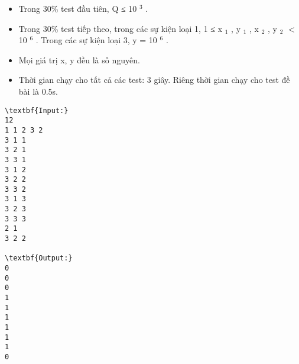 \begin{itemize}
	\item Trong 30\% test đầu tiên, Q ≤ 10 $^ 3 $ .
	\item Trong 30\% test tiếp theo, trong các sự kiện loại 1, 1 ≤ x $_ 1 $ , y $_ 1 $ , x $_ 2 $ , y $_ 2 $ $<$ 10 $^ 6 $ . Trong các sự kiện loại 3, y = 10 $^ 6 $ .
	\item Mọi giá trị x, y đều là số nguyên.
	\item Thời gian chạy cho tất cả các test: 3 giây. Riêng thời gian chạy cho test đề bài là 0.5s.
\end{itemize}
\begin{verbatim}
\textbf{Input:}
12
1 1 2 3 2
3 1 1
3 2 1
3 3 1
3 1 2
3 2 2
3 3 2
3 1 3
3 2 3
3 3 3
2 1
3 2 2

\textbf{Output:}
0
0
0
1
1
1
1
1
1
0
\end{verbatim}